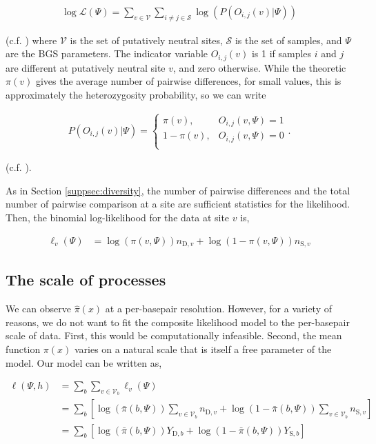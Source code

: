 \documentclass[11pt]{article}
\begin{document}
\begin{align}
  \log\mathcal{L}(\Psi) = \sum_{v \in \mathcal{V}} \sum_{i \ne j \in \mathcal{S}} \log(P(O_{i,j}(v) | \Psi))
\end{align}

(c.f. \cite{McVicker2009-ax,Elyashiv2016-vt,Murphy2022-sj}) where $\mathcal{V}$
is the set of putatively neutral sites, $\mathcal{S}$ is the set of samples,
and $\Psi$ are the BGS parameters. The indicator variable $O_{i,j}(v)$ is 1 if
samples $i$ and $j$ are different at putatively neutral site $v$, and zero
otherwise. While the theoretic $\pi(v)$ gives the average number of pairwise
differences, for small values, this is approximately the heterozygosity
probability, so we can write

\begin{align}
  P(O_{i,j}(v) | \Psi) = 
    \begin{cases}
      \pi(v), & O_{i,j}(v, \Psi) = 1 \\
      1-\pi(v), & O_{i,j}(v, \Psi) = 0 \\
    \end{cases}.
\end{align}

(c.f. \cite{Elyashiv2016-vt}). 

As in Section \ref{suppsec:diversity}, the number of pairwise differences and
the total number of pairwise comparison at a site are sufficient statistics for
the likelihood. Then, the binomial log-likelihood for the data at site $v$ is,

\begin{align}
  \ell_v(\Psi) &= \log(\pi(v, \Psi)) n_{\text{D},v} + \log(1-\pi(v, \Psi)) n_{\text{S},{v}}
\end{align}

\subsection{The scale of processes}

We can observe $\widehat{\pi}(x)$ at a per-basepair resolution. However, for a
variety of reasons, we do not want to fit the composite likelihood model to the
per-basepair scale of data. First, this would be computationally infeasible.
Second, the mean function $\pi(x)$ varies on a natural scale that is itself a
free parameter of the model. Our model can be written as, 

\begin{align}
  \ell(\Psi, h) &= \sum_{b} \sum_{v \in \mathcal{V}_b} \ell_v(\Psi) \\
             &= \sum_{b} \left[\log(\bar{\pi}(b, \Psi)) \sum_{v \in \mathcal{V}_b} n_{\text{D},v} + \log(1-\bar{\pi}(b, \Psi)) \sum_{v \in \mathcal{V}_b} n_{\text{S},{v}}\right] \\
             &= \sum_{b} \left[\log(\bar{\pi}(b, \Psi)) Y_{\text{D},b} + \log(1-\bar{\pi}(b, \Psi)) Y_{\text{S},{b}}\right] \\
\end{align}
\end{document}
